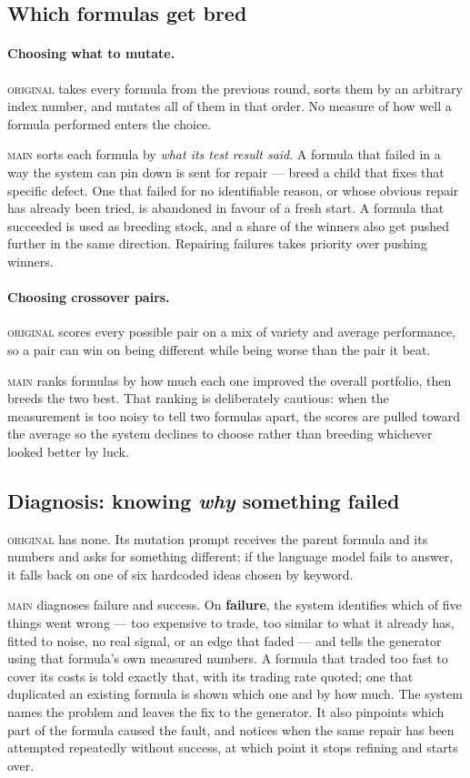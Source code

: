 \documentclass[11pt]{article}
\newcommand{\main}{\textsc{main}}
\newcommand{\orig}{\textsc{original}}
\begin{document}
\subsection{Which formulas get bred}

\paragraph{Choosing what to mutate.}
\orig{} takes every formula from the previous round, sorts them by an arbitrary index
number, and mutates all of them in that order. No measure of how well a formula
performed enters the choice.

\main{} sorts each formula by \emph{what its test result said}. A formula that failed
in a way the system can pin down is sent for repair --- breed a child that fixes that
specific defect. One that failed for no identifiable reason, or whose obvious repair
has already been tried, is abandoned in favour of a fresh start. A formula that
succeeded is used as breeding stock, and a share of the winners also get pushed
further in the same direction. Repairing failures takes priority over pushing winners.

\paragraph{Choosing crossover pairs.}
\orig{} scores every possible pair on a mix of variety and average performance, so a
pair can win on being different while being worse than the pair it beat.

\main{} ranks formulas by how much each one improved the overall portfolio, then
breeds the two best. That ranking is deliberately cautious: when the measurement is
too noisy to tell two formulas apart, the scores are pulled toward the average so the
system declines to choose rather than breeding whichever looked better by luck.

\subsection{Diagnosis: knowing \emph{why} something failed}

\orig{} has none. Its mutation prompt receives the parent formula and its numbers and
asks for something different; if the language model fails to answer, it falls back on
one of six hardcoded ideas chosen by keyword.

\main{} diagnoses failure and success. On \textbf{failure}, the system identifies
which of five things went wrong --- too expensive to trade, too similar to what it
already has, fitted to noise, no real signal, or an edge that faded --- and tells the
generator using that formula's own measured numbers. A formula that traded too fast to
cover its costs is told exactly that, with its trading rate quoted; one that
duplicated an existing formula is shown which one and by how much. The system names
the problem and leaves the fix to the generator. It also pinpoints which part of the
formula caused the fault, and notices when the same repair has been attempted
repeatedly without success, at which point it stops refining and starts over.
\end{document}
